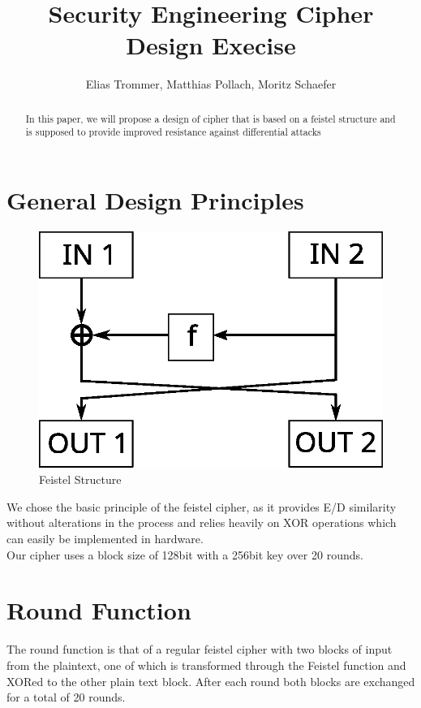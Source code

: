 \documentclass[a4paper]{article}
\begin{document}
    \title{Security Engineering Cipher Design Execise}
    \author{Elias Trommer, Matthias Pollach, Moritz Schaefer}
    \maketitle
    \begin{abstract}
	In this paper, we will propose a design of cipher that is based on a feistel structure and is supposed to provide improved resistance against differential attacks
    \end{abstract}
    \tableofcontents
    \section{General Design Principles}
        \begin{figure}[h!]
	\centering
	\includegraphics[scale=.4]{feistelstruc.eps}
	\caption{Feistel Structure}
	\label{fig:feistel}
    \end{figure}
 We chose the basic principle of the feistel cipher, as it provides E/D similarity without alterations in the process and relies heavily on XOR operations which can easily be implemented in hardware.\\[0.5em]
    Our cipher uses a block size of 128bit with a 256bit key over 20 rounds. 
    \section{Round Function}
	The round function is that of a regular feistel cipher with two blocks of input from the plaintext, one of which is transformed through the Feistel function and XORed to the other plain text block. After each round both blocks are exchanged for a total of 20 rounds.
\end{document}
